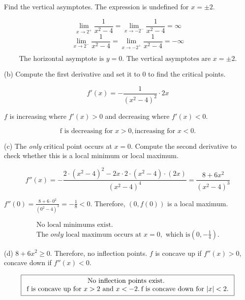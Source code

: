 \documentclass{article}
\begin{document}
\hfill

\noindent Find the vertical asymptotes. The expression is undefined for $x=\pm2$.

\[\lim_{x\to2^+}\frac{1}{x^2-4}=\lim_{x\to-2^-}\frac{1}{x^2-4}=\infty\]
\[\lim_{x\to2^-}\frac{1}{x^2-4}=\lim_{x\to-2^+}\frac{1}{x^2-4}=-\infty\]

\[\boxed{\text{The horizontal asymptote is } y= 0. \text{ The vertical asymptotes are } x=\pm2.}\]

\hfill

\noindent (b) Compute the first derivative and set it to $0$ to find the critical points.

\[f'(x)=-\frac{1}{\left(x^2-4\right)^2}\cdot2x\]

\noindent $f$ is increasing where $f'(x)>0$ and decreasing where $f'(x)<0$.

\[\boxed{\text{f is decreasing for } x>0, \text{increasing for } x<0.}\]

\hfill

\noindent (c) The \textit{only} critical point occurs at $x=0$. Compute the second derivative to check whether this is a local minimum or local maximum.

\begin{equation*}f''(x)=-\frac{2\cdot\left(x^2-4\right)^2-2x\cdot2\cdot(x^2-4)\cdot(2x)}{\left(x^2-4\right)^4}=\frac{8+6x^2}{\left(x^2-4\right)^3}\end{equation*}

\hfill

\noindent $\displaystyle f''(0)=\frac{8+6\cdot0^2}{\left(0^2-4\right)^3}=-\frac18<0$. Therefore, $(0, f(0))$  is a local maximum.

\[
\boxed{
\begin{array}{c}
\displaystyle \text{No local minimums exist.}\\\displaystyle \text{The }\textit{only} \text{ local maximum occurs at } x=0,\text{ which is}\left(0,-\frac14\right).
\end{array}}\]

\hfill

\noindent (d) $8+6x^2 \geq 0$. Therefore, no inflection points. $f$ is concave up if $f''(x)>0$, concave down if $f''(x)<0$.

\[
\boxed{
\begin{array}{c}
\displaystyle \text{No inflection points exist. }\\$f$ \text{ is concave up for } x>2 \text{ and } x<-2.\:$f$ \text{ is concave down for } |x|<2.
\end{array}}\]
\end{document}
